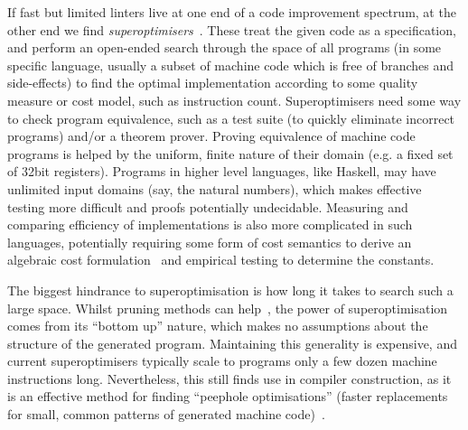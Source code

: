 If fast but limited linters live at one end of a code improvement spectrum, at
the other end we find \emph{superoptimisers}~\cite{massalin1987superoptimizer}.
These treat the given code as a specification, and perform an open-ended search
through the space of all programs (in some specific language, usually a subset
of machine code which is free of branches and side-effects) to find the optimal
implementation according to some quality measure or cost model, such as
instruction count. Superoptimisers need some way to check program equivalence,
such as a test suite (to quickly eliminate incorrect programs) and/or a theorem
prover. Proving equivalence of machine code programs is helped by the uniform,
finite nature of their domain (e.g. a fixed set of 32bit registers). Programs in
higher level languages, like Haskell, may have unlimited input domains (say, the
natural numbers), which makes effective testing more difficult and proofs
potentially undecidable. Measuring and comparing efficiency of implementations
is also more complicated in such languages, potentially requiring some form of
cost semantics to derive an algebraic cost
formulation~\cite{danner2015denotational} and empirical testing to determine the
constants.

The biggest hindrance to superoptimisation is how long it takes to search such a
large space. Whilst pruning methods can help~\cite{phothilimthana2016scaling},
the power of superoptimisation comes from its ``bottom up'' nature, which makes
no assumptions about the structure of the generated program. Maintaining this
generality is expensive, and current superoptimisers typically scale to programs
only a few dozen machine instructions long. Nevertheless, this still finds use
in compiler construction, as it is an effective method for finding ``peephole
optimisations'' (faster replacements for small, common patterns of generated
machine code)~\cite{Bansal.Aiken:2006}.
